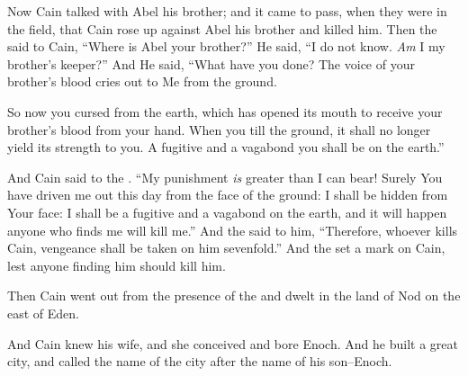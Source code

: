 \bverse Now Cain talked with Abel his brother; and it came to pass, when they were in the field, that Cain rose up against Abel his brother and killed him.
\bverse Then the \lord said to Cain, ``Where is Abel your brother?'' He said, ``I do not know. \textit{Am} I my brother's keeper?''
\bverse And He said, ``What have you done? The voice of your brother's blood cries out to Me from the ground.

\bverse So now you \are cursed from the earth, which has opened its mouth to receive your brother's blood from your hand.
\bverse When you till the ground, it shall no longer yield its strength to you. A fugitive and a vagabond you shall be on the earth.''
	
\bverse And Cain said to the \lord. ``My punishment \textit{is} greater than I can bear!
\bverse Surely You have driven me out this day from the face of the ground: I shall be hidden from Your face: I shall be a fugitive and a vagabond on the earth, and it will happen \that anyone who finds me will kill me.''
\bverse And the \lord said to him, ``Therefore, whoever kills Cain, vengeance shall be taken on him sevenfold.'' And the \lord set a mark on Cain, lest anyone finding him should kill him.


\bverse Then Cain went out from the presence of the \lord and dwelt in the land of Nod on the east of Eden.

\bverse And Cain knew his wife, and she conceived and bore Enoch. And he built a great city, and called the name of the city after the name of his son--Enoch.
	
